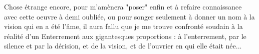 Chose étrange encore, pour m'amènera "poser" enfin et à refaire connaissance avec cette oeuvre à demi oubliée, ou pour songer seulement à donner un nom à la vision qui en a été l'âme, il aura fallu que je me trouve confronté soudain à la réalité d'un Enterrement aux gigantesques proportions : à l'enterrement, par le silence et par la dérision, et de la vision, et de l'ouvrier en qui elle était née...



